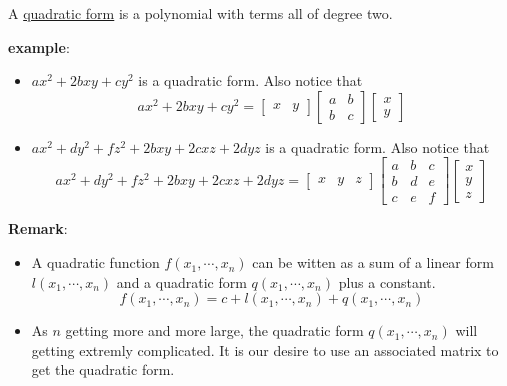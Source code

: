 \begin{definition}
    A \underline{quadratic form} is a polynomial with terms all of degree two.
\end{definition}
\noindent \textbf{example}:
\begin{itemize}
    \item $ax^2+2bxy+cy^2$ is a quadratic form. Also notice that
    \begin{equation}
        ax^2+2bxy+cy^2=\begin{bmatrix}
            x & y
        \end{bmatrix}\begin{bmatrix}
            a & b\\
            b & c
        \end{bmatrix}\begin{bmatrix}
            x\\
            y
        \end{bmatrix}
    \end{equation}
    \item $ax^2+dy^2+fz^2+2bxy+2cxz+2dyz$ is a quadratic form. Also notice that
    \begin{equation}
        ax^2+dy^2+fz^2+2bxy+2cxz+2dyz=\begin{bmatrix}
            x & y & z
        \end{bmatrix}\begin{bmatrix}
            a & b & c\\
            b & d & e\\
            c & e & f
        \end{bmatrix}\begin{bmatrix}
            x\\
            y\\
            z
        \end{bmatrix}
    \end{equation}
\end{itemize}
\noindent \textbf{Remark}:
\begin{itemize}
    \item A quadratic function $f(x_1,\cdots,x_n)$ can be witten as a sum of a linear form $l(x_1,\cdots,x_n)$ and a quadratic form $q(x_1,\cdots,x_n)$ plus a constant.
    $$f(x_1,\cdots,x_n)=c+l(x_1,\cdots,x_n)+q(x_1,\cdots,x_n)$$
    \item As $n$ getting more and more large, the quadratic form $q(x_1,\cdots,x_n)$ will getting extremly complicated. It is our desire to use an associated matrix to get the quadratic form.
\end{itemize}

